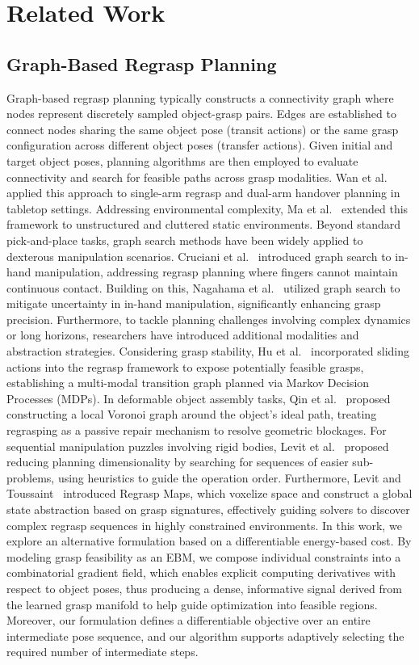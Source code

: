 \documentclass[journal, twoside]{IEEEtran}
\begin{document}
\section{Related Work}
\subsection{Graph-Based Regrasp Planning}

Graph-based regrasp planning typically constructs a connectivity graph where nodes represent discretely sampled object-grasp pairs. Edges are established to connect nodes sharing the same object pose (transit actions) or the same grasp configuration across different object poses (transfer actions). Given initial and target object poses, planning algorithms are then employed to evaluate connectivity and search for feasible paths across grasp modalities. Wan et al.~\cite{8611208} applied this approach to single-arm regrasp and dual-arm handover planning in tabletop settings. Addressing environmental complexity, Ma et al.~\cite{8453906} extended this framework to unstructured and cluttered static environments. Beyond standard pick-and-place tasks, graph search methods have been widely applied to dexterous manipulation scenarios. Cruciani et al.~\cite{8594303} introduced graph search to in-hand manipulation, addressing regrasp planning where fingers cannot maintain continuous contact. Building on this, Nagahama et al.~\cite{11037521} utilized graph search to mitigate uncertainty in in-hand manipulation, significantly enhancing grasp precision.
Furthermore, to tackle planning challenges involving complex dynamics or long horizons, researchers have introduced additional modalities and abstraction strategies. Considering grasp stability, Hu et al.~\cite{10341842} incorporated sliding actions into the regrasp framework to expose potentially feasible grasps, establishing a multi-modal transition graph planned via Markov Decision Processes (MDPs). In deformable object assembly tasks, Qin et al.~\cite{10093024} proposed constructing a local Voronoi graph around the object's ideal path, treating regrasping as a passive repair mechanism to resolve geometric blockages. For sequential manipulation puzzles involving rigid bodies, Levit et al.~\cite{10610974} proposed reducing planning dimensionality by searching for sequences of easier sub-problems, using heuristics to guide the operation order. Furthermore, Levit and Toussaint~\cite{11247727} introduced Regrasp Maps, which voxelize space and construct a global state abstraction based on grasp signatures, effectively guiding solvers to discover complex regrasp sequences in highly constrained environments. In this work, we explore an alternative formulation based on a differentiable energy-based cost. By modeling grasp feasibility as an EBM, we compose individual constraints into a combinatorial gradient field, which enables explicit computing derivatives with respect to object poses, thus producing a dense, informative signal derived from the learned grasp manifold to help guide optimization into feasible regions. Moreover, our formulation defines a differentiable objective over an entire intermediate pose sequence, and our algorithm supports adaptively selecting the required number of intermediate steps.
\end{document}
